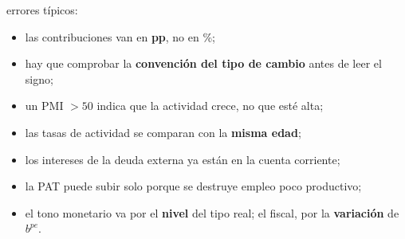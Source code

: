\documentclass{article}
\begin{document}
\begin{columnas}
\begin{trampa}
errores típicos:
\begin{itemize}
\item las contribuciones van en \textbf{pp}, no en \%;
\item hay que comprobar la \textbf{convención del tipo de cambio} antes de leer el signo;
\item un PMI $>50$ indica que la actividad crece, no que esté alta;
\item las tasas de actividad se comparan con la \textbf{misma edad};
\item los intereses de la deuda externa ya están en la cuenta corriente;
\item la PAT puede subir solo porque se destruye empleo poco productivo;
\item el tono monetario va por el \textbf{nivel} del tipo real; el fiscal, por la \textbf{variación} de $b^{pe}$.
\end{itemize}
\end{trampa}


\end{columnas}
\end{document}
